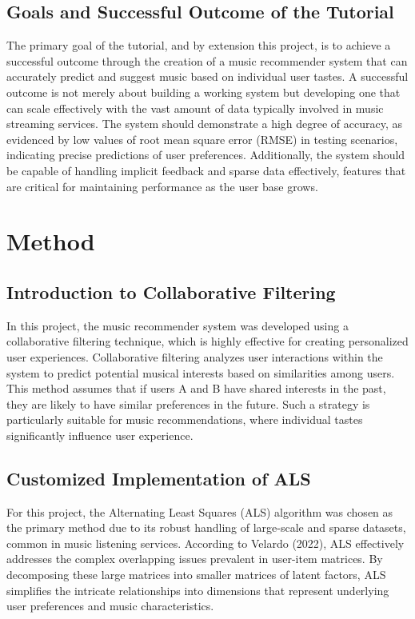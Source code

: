 \documentclass[10pt,twocolumn]{article}
\begin{document}
\subsection{Goals and Successful Outcome of the Tutorial}
The primary goal of the tutorial, and by extension this project, is to achieve a successful outcome through the creation of a music recommender system that can accurately predict and suggest music based on individual user tastes. A successful outcome is not merely about building a working system but developing one that can scale effectively with the vast amount of data typically involved in music streaming services. The system should demonstrate a high degree of accuracy, as evidenced by low values of root mean square error (RMSE) in testing scenarios, indicating precise predictions of user preferences. Additionally, the system should be capable of handling implicit feedback and sparse data effectively, features that are critical for maintaining performance as the user base grows.


\section{Method}
\subsection{Introduction to Collaborative Filtering}
In this project, the music recommender system was developed using a collaborative filtering technique, which is highly effective for creating personalized user experiences. Collaborative filtering analyzes user interactions within the system to predict potential musical interests based on similarities among users. This method assumes that if users A and B have shared interests in the past, they are likely to have similar preferences in the future. Such a strategy is particularly suitable for music recommendations, where individual tastes significantly influence user experience.

\subsection{Customized Implementation of ALS}

For this project, the Alternating Least Squares (ALS) algorithm was chosen as the primary method due to its robust handling of large-scale and sparse datasets, common in music listening services. According to Velardo (2022), ALS effectively addresses the complex overlapping issues prevalent in user-item matrices. By decomposing these large matrices into smaller matrices of latent factors, ALS simplifies the intricate relationships into dimensions that represent underlying user preferences and music characteristics.
\end{document}

